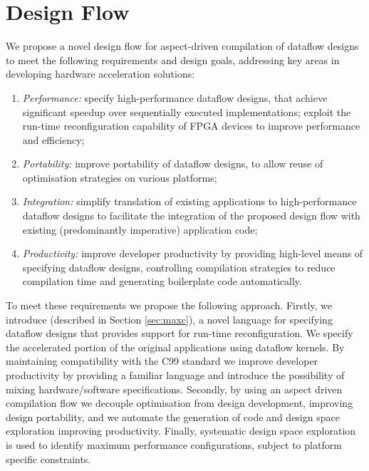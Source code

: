 \section{Design Flow}
\label{sec:design-flow}

We propose a novel design flow for aspect-driven compilation of
dataflow designs to meet the following requirements and design goals,
addressing key areas in developing hardware acceleration solutions:
\begin{enumerate}
\item \emph{Performance:} specify high-performance dataflow designs,
  that achieve significant speedup over sequentially executed
  implementations; exploit the run-time reconfiguration capability of
  FPGA devices to improve performance and efficiency;
\item \emph{Portability:} improve portability of dataflow designs, to
  allow reuse of optimisation strategies on various platforms;
\item \emph{Integration:} simplify translation of existing
  applications to high-performance dataflow designs to facilitate the
  integration of the proposed design flow with existing (predominantly
  imperative) application code;
\item \emph{Productivity:} improve developer productivity by providing
  high-level means of specifying dataflow designs, controlling
  compilation strategies to reduce compilation time and generating
  boilerplate code automatically.
\end{enumerate}

To meet these requirements we propose the following approach. Firstly,
we introduce \MAXC{} (described in Section \ref{sec:maxc}), a novel
language for specifying dataflow designs that provides support for
run-time reconfiguration. We specify the accelerated portion of the
original applications using \MAXC{} dataflow kernels. By maintaining
compatibility with the C99 standard we improve developer productivity
by providing a familiar language and introduce the possibility of
mixing hardware/software specifications. Secondly, by using an aspect
driven compilation flow we decouple optimisation from design
development, improving design portability, and we automate the
generation of code and design space exploration improving
productivity. Finally, systematic design space exploration is used to
identify maximum performance configurations, subject to platform
specific constraints.

